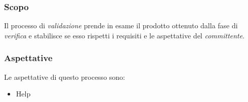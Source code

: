 			\subsubsection{Scopo}
				Il processo di \emph{validazione} prende in esame il prodotto ottenuto dalla fase di \emph{verifica} e stabilisce se esso rispetti i requisiti e le aspettative del \emph{committente}.
			\subsubsection{Aspettative}
				Le aspettative di questo processo sono:
					\begin{itemize}
						\item Help%
					\end{itemize}
